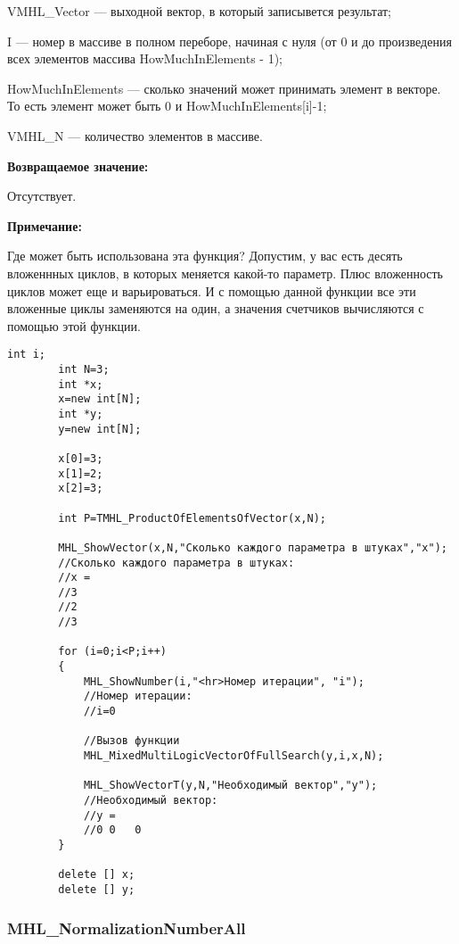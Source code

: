 \documentclass[a4paper,12pt]{article}
\begin{document}
VMHL\_Vector --- выходной вектор, в который записывется результат;
 
I --- номер в массиве в полном переборе, начиная с нуля (от 0 и до произведения всех элементов массива HowMuchInElements - 1);
 
HowMuchInElements --- сколько значений может принимать элемент в векторе. То есть элемент может быть 0 и HowMuchInElements[i]-1;
 
VMHL\_N --- количество элементов в массиве.

\textbf{Возвращаемое значение:}
 
Отсутствует.

\textbf{Примечание:}
 
Где может быть использована эта функция? Допустим, у вас есть десять вложеннных циклов, в которых меняется какой-то параметр. Плюс вложенность циклов может еще и варьироваться. И с помощью данной функции все эти вложенные циклы заменяются на один, а значения счетчиков вычисляются с помощью этой функции.


\begin{lstlisting}[label=code_use_MHL_MixedMultiLogicVectorOfFullSearch,caption=Пример использования]
        int i;
        int N=3;
        int *x;
        x=new int[N];
        int *y;
        y=new int[N];

        x[0]=3;
        x[1]=2;
        x[2]=3;

        int P=TMHL_ProductOfElementsOfVector(x,N);

        MHL_ShowVector(x,N,"Сколько каждого параметра в штуках","x");
        //Сколько каждого параметра в штуках:
        //x =
        //3
        //2
        //3

        for (i=0;i<P;i++)
        {
            MHL_ShowNumber(i,"<hr>Номер итерации", "i");
            //Номер итерации:
            //i=0

            //Вызов функции
            MHL_MixedMultiLogicVectorOfFullSearch(y,i,x,N);

            MHL_ShowVectorT(y,N,"Необходимый вектор","y");
            //Необходимый вектор:
            //y =
            //0	0	0
        }

        delete [] x;
        delete [] y;
\end{lstlisting}

\subsubsection{MHL\_NormalizationNumberAll}\label{MHL_NormalizationNumberAll}
\end{document}

